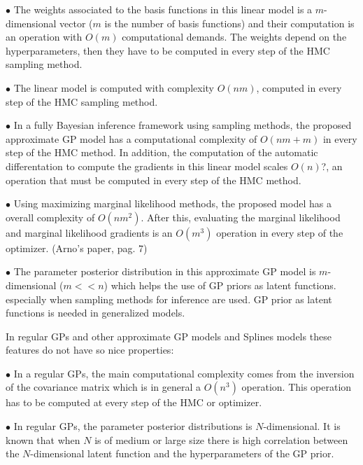 \documentclass[]{interact}
\theoremstyle{plain}%
\theoremstyle{definition}
\theoremstyle{remark}
\begin{document}
\vspace{2mm}
$\bullet$ The weights associated to the basis functions in this linear model is a $m$-dimensional vector ($m$ is the number of basis functions) and their computation is an operation with $O(m)$ computational demands. The weights depend on the hyperparameters, then they have to be computed in every step of the HMC sampling method.

\vspace{2mm}
$\bullet$ The linear model is computed with complexity $O(nm)$, computed in every step of the HMC sampling method.

\vspace{2mm}
$\bullet$ In a fully Bayesian inference framework using sampling methods, the proposed approximate GP model has a computational complexity of $O(nm+m)$ in every step of the HMC method. In addition, the computation of the automatic differentation to compute the gradients in this linear model scales $O(n)$?, an operation that must be computed in every step of the HMC method.

\vspace{2mm}
$\bullet$ Using maximizing marginal likelihood methods, the proposed model has a overall complexity of $O(nm^2)$. After this, evaluating the marginal likelihood and marginal likelihood gradients is an $O(m^3)$ operation in every step of the optimizer. (Arno's paper, pag. 7)

\vspace{2mm}
$\bullet$ The parameter posterior distribution in this approximate GP model is $m$-dimensional ($m<<n$) which helps the use of GP priors as latent functions. especially when sampling methods for inference are used. GP prior as latent functions is needed in generalized models.

In regular GPs and other approximate GP models and Splines models these features do not have so nice properties:

\vspace{2mm}
$\bullet$ In a regular GPs, the main computational complexity comes from the inversion of the covariance matrix which is in general a $O(n^3)$ operation. This operation has to be computed at every step of the HMC or optimizer.

\vspace{2mm}
$\bullet$ In regular GPs, the parameter posterior distributions is $N$-dimensional. It is known that when $N$ is of medium or large size there is high correlation between the $N$-dimensional latent function and the hyperparameters of the GP prior.
\end{document}
